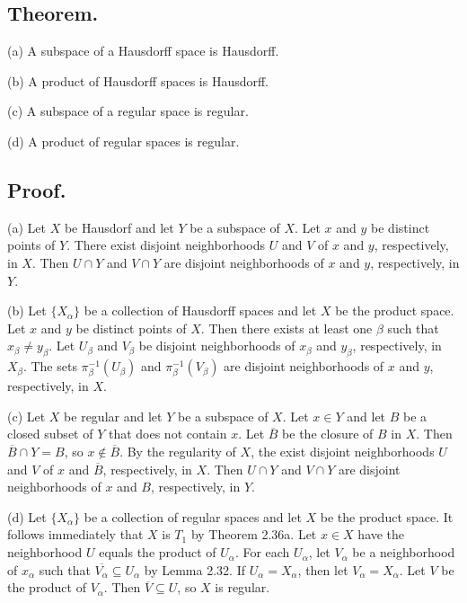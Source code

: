 \documentclass[titlepage]{article}
\begin{document}
\subsection{Theorem.}

(a) A subspace of a Hausdorff space is Hausdorff.

(b) A product of Hausdorff spaces is Hausdorff.

(c) A subspace of a regular space is regular.

(d) A product of regular spaces is regular.

\subsection{Proof.}

(a) Let $X$ be Hausdorf and let $Y$ be a subspace of $X$. Let $x$ and $y$ be distinct points of $Y$. There exist disjoint neighborhoods $U$ and $V$ of $x$ and $y$, respectively, in $X$. Then $U \cap Y$ and $V \cap Y$ are disjoint neighborhoods of $x$ and $y$, respectively, in $Y$.

(b) Let $\{X_{\alpha}\}$ be a collection of Hausdorff spaces and let $X$ be the product space. Let $x$ and $y$ be distinct points of $X$. Then there exists at least one $\beta$ such that $x_{\beta} \neq y_{\beta}$. Let $U_{\beta}$ and $V_{\beta}$ be disjoint neighborhoods of $x_{\beta}$ and $y_{\beta}$, respectively, in $X_{\beta}$. The sets $\pi_{\beta}^{-1}(U_{\beta})$ and $\pi_{\beta}^{-1}(V_{\beta})$ are disjoint neighborhoods of $x$ and $y$, respectively, in $X$.

(c) Let $X$ be regular and let $Y$ be a subspace of $X$. Let $x \in Y$ and let $B$ be a closed subset of $Y$ that does not contain $x$. Let $\overline{B}$ be the closure of $B$ in $X$. Then $\overline{B} \cap Y = B$, so $x \not\in \overline{B}$. By the regularity of $X$, the exist disjoint neighborhoods $U$ and $V$ of $x$ and $\overline{B}$, respectively, in $X$. Then $U \cap Y$ and $V \cap Y$ are disjoint neighborhoods of $x$ and $B$, respectively, in $Y$.

(d) Let $\{X_{\alpha}\}$ be a collection of regular spaces and let $X$ be the product space. It follows immediately that $X$ is $T_{1}$ by Theorem 2.36a. Let $x \in X$ have the neighborhood $U$ equals the product of $U_{\alpha}$. For each $U_{\alpha}$, let $V_{\alpha}$ be a neighborhood of $x_{\alpha}$ such that $\overline{V_{\alpha}} \subseteq U_{\alpha}$ by Lemma 2.32. If $U_{\alpha} = X_{\alpha}$, then let $V_{\alpha} = X_{\alpha}$. Let $V$ be the product of $V_{\alpha}$. Then $\overline{V} \subseteq U$, so $X$ is regular.
\end{document}
